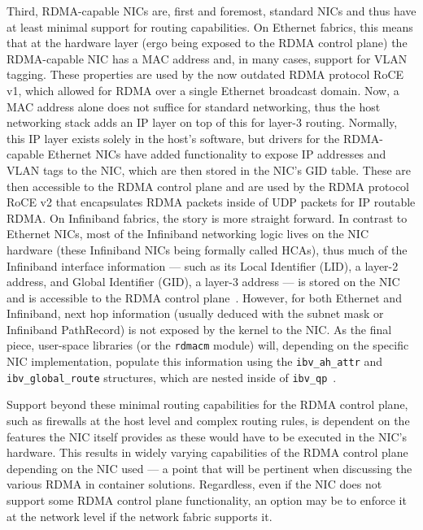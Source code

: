 \documentclass[12pt,titlepage]{article}
\begin{document}
Third, RDMA-capable NICs are, first and foremost, standard NICs and thus have at least minimal support for routing capabilities.
On Ethernet fabrics, this means that at the hardware layer (ergo being exposed to the RDMA control plane) the RDMA-capable NIC has a MAC address and, in many cases, support for VLAN tagging.
These properties are used by the now outdated RDMA protocol RoCE v1, which allowed for RDMA over a single Ethernet broadcast domain.
Now, a MAC address alone does not suffice for standard networking, thus the host networking stack adds an IP layer on top of this for layer-3 routing.
Normally, this IP layer exists solely in the host's software, but drivers for the RDMA-capable Ethernet NICs have added functionality to expose IP addresses and VLAN tags to the NIC, which are then stored in the NIC's GID table.
These are then accessible to the RDMA control plane and are used by the RDMA protocol RoCE v2 that encapsulates RDMA packets inside of UDP packets for IP routable RDMA\@.
On Infiniband fabrics, the story is more straight forward.
In contrast to Ethernet NICs, most of the Infiniband networking logic lives on the NIC hardware (these Infiniband NICs being formally called HCAs), thus much of the Infiniband interface information --- such as its Local Identifier (LID), a layer-2 address, and Global Identifier (GID), a layer-3 address --- is stored on the NIC and is accessible to the RDMA control plane~\cite{mlnxofedmanual}.
However, for both Ethernet and Infiniband, next hop information (usually deduced with the subnet mask or Infiniband PathRecord) is not exposed by the kernel to the NIC\@.
As the final piece, user-space libraries (or the \texttt{rdmacm} module) will, depending on the specific NIC implementation, populate this information using the \texttt{ibv\_ah\_attr} and \texttt{ibv\_global\_route} structures, which are nested inside of \texttt{ibv\_qp}~\cite{rdmaawareprogramming,infinibandarch,rdmacorerepo}.

Support beyond these minimal routing capabilities for the RDMA control plane, such as firewalls at the host level and complex routing rules, is dependent on the features the NIC itself provides as these would have to be executed in the NIC's hardware.
This results in widely varying capabilities of the RDMA control plane depending on the NIC used --- a point that will be pertinent when discussing the various RDMA in container solutions.
Regardless, even if the NIC does not support some RDMA control plane functionality, an option may be to enforce it at the network level if the network fabric supports it.
\end{document}
